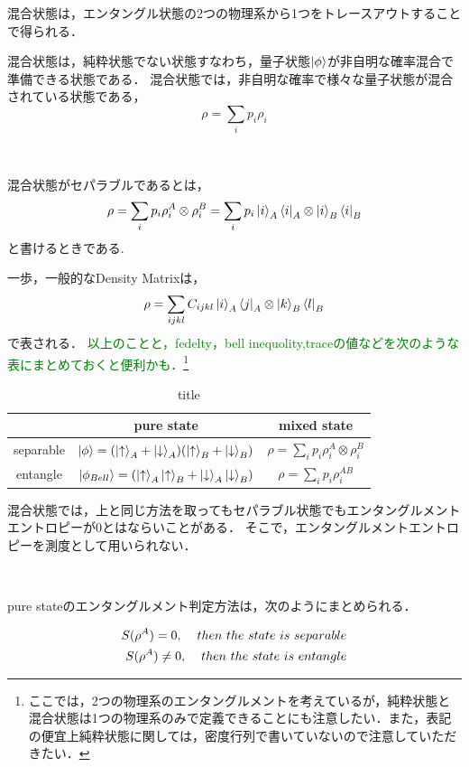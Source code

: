混合状態は，エンタングル状態の2つの物理系から1つをトレースアウトすることで得られる．



混合状態は，純粋状態でない状態すなわち，量子状態$\ket{\phi}$が非自明な確率混合で準備できる状態である．
混合状態では，非自明な確率で様々な量子状態が混合されている状態である，
\begin{equation}
\rho=\sum_{i}p_i\rho_{i}
\end{equation}
\begin{empheqboxed}
  \
  \

  混合状態がセパラブルであるとは，
  \begin{equation}
  \label{30}
  \rho=\sum_{i}p_i\rho^{A}_{i}\otimes\rho^{B}_{i}=\sum_{i}p_i\ket{i}_A\bra{i}_{A}\otimes\ket{i}_B\bra{i}_{B}
  \end{equation}
  と書けるときである.
\end{empheqboxed}
一歩，一般的なDensity Matrixは，
\begin{eqnarray}
\label{40}
\rho=\sum_{ijkl}C_{ijkl}\ket{i}_A\bra{j}_{A}\otimes\ket{k}_B\bra{l}_{B}
\end{eqnarray}
で表される．
\textcolor{green}{以上のことと，fedelty，bell inequolity,traceの値などを次のような表にまとめておくと便利かも．}\footnote{ここでは，2つの物理系のエンタングルメントを考えているが，純粋状態と混合状態は1つの物理系のみで定義できることにも注意したい．また，表記の便宜上純粋状態に関しては，密度行列で書いていないので注意していただきたい．}
{\renewcommand{\arraystretch}{2}
\begin{table}[H]
  \begin{center}
    \begin{tabular}{c|c|c}
       & pure state & mixed state  \\\hline
      separable & $ \ket{\phi}=(\ket{\uparrow}_{A}+\ket{\downarrow}_{A})(\ket{\uparrow}_{B} +\ket{\downarrow}_{B})$ & $\rho=\sum_{i}p_i\rho^{A}_{i}\otimes\rho^{B}_{i}$ \\\hline
      entangle &    $\ket{\phi_{Bell}}=(\ket{\uparrow}_{A}\ket{\uparrow}_{B}+\ket{\downarrow}_{A}\ket{\downarrow}_{B})$  & $\rho=\sum_{i}p_i\rho^{AB}_{i}$
    \end{tabular}
  \end{center}
  \caption{title}
\end{table}}

混合状態では，上と同じ方法を取ってもセパラブル状態でもエンタングルメントエントロピーが$0$とはならいことがある．
そこで，エンタングルメントエントロピーを測度として用いられない．
\begin{empheqboxed}
  \
  \

  pure stateのエンタングルメント判定方法は，次のようにまとめられる．

  \begin{align}
    S(\rho^{A})=0, \hspace{4mm} then\ the\ state\ is\ separable\\
    S(\rho^{A})\neq0, \hspace{4mm} then\ the\ state\ is\ entangle
  \end{align}
\end{empheqboxed}

